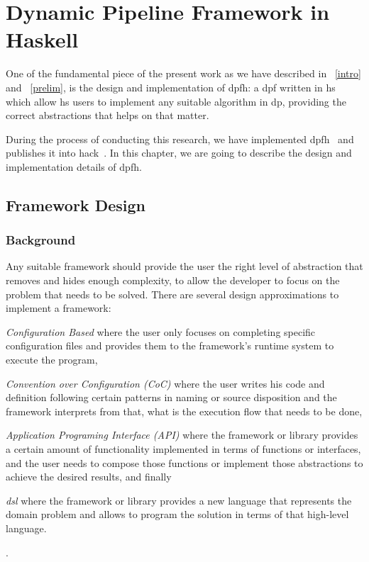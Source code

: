 \chapter{Dynamic Pipeline Framework in Haskell}\label{dp-hs}
One of the fundamental piece of the present work as we have described in ~\autoref{intro} and ~\autoref{prelim},
is the design and implementation of \acrfull{dpfh}: a \acrshort{dpf} written in \acrshort{hs} which allow \acrshort{hs} users
to implement any suitable algorithm in \acrshort{dp}, providing the correct abstractions that helps on that matter.

During the process of conducting this research, we have implemented \acrshort{dpfh}~\cite{dynamic-pipeline} and publishes it into \acrfull{hack}~\cite{hackage}.
In this chapter, we are going to describe the design and implementation details of \acrshort{dpfh}.

\section{Framework Design}

\subsection{Background}
Any suitable framework should provide the user the right level of abstraction that removes and hides enough complexity, 
to allow the developer to focus on the problem that needs to be solved.
There are several design approximations to implement a framework: \begin{inparaenum}[i\upshape)]
  \item  \emph{Configuration Based} where the user only 
  focuses on completing specific configuration files and provides them to the framework's runtime system to execute the program,
  \item  \emph{Convention over Configuration (CoC)} where the user writes his code and definition following certain patterns in naming or source disposition 
  and the framework interprets from that, what is the execution flow that needs to be done,
  \item \emph{Application Programing Interface (API)} where the framework or library provides a certain amount
  of functionality implemented in terms of functions or interfaces, and the user needs to compose those functions or implement those abstractions to achieve the desired results, and finally
  \item \emph{\acrfull{dsl}} where the framework or library provides a new language that represents the domain problem and allows to program the solution in terms of that high-level language. 
   \end{inparaenum}.

